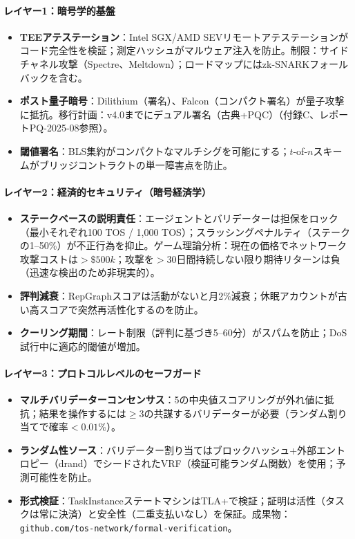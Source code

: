 \documentclass[11pt]{article}
\begin{document}
\paragraph{レイヤー1：暗号学的基盤}
\begin{itemize}[noitemsep]
  \item \textbf{TEEアテステーション}：Intel SGX/AMD SEVリモートアテステーションがコード完全性を検証；測定ハッシュがマルウェア注入を防止。制限：サイドチャネル攻撃（Spectre、Meltdown）；ロードマップにはzk-SNARKフォールバックを含む。
  \item \textbf{ポスト量子暗号}：Dilithium（署名）、Falcon（コンパクト署名）が量子攻撃に抵抗。移行計画：v4.0までにデュアル署名（古典+PQC）（付録C、レポートPQ-2025-08参照）。
  \item \textbf{閾値署名}：BLS集約がコンパクトなマルチシグを可能にする；$t$-of-$n$スキームがブリッジコントラクトの単一障害点を防止。
\end{itemize}

\paragraph{レイヤー2：経済的セキュリティ（暗号経済学）}
\begin{itemize}[noitemsep]
  \item \textbf{ステークベースの説明責任}：エージェントとバリデーターは担保をロック（最小それぞれ100 TOS / 1,000 TOS）；スラッシングペナルティ（ステークの1--50\%）が不正行為を抑止。ゲーム理論分析：現在の価格でネットワーク攻撃コストは$>\$500k$；攻撃を$>30$日間持続しない限り期待リターンは負（迅速な検出のため非現実的）。
  \item \textbf{評判減衰}：RepGraphスコアは活動がないと月2\%減衰；休眠アカウントが古い高スコアで突然再活性化するのを防止。
  \item \textbf{クーリング期間}：レート制限（評判に基づき5--60分）がスパムを防止；DoS試行中に適応的閾値が増加。
\end{itemize}

\paragraph{レイヤー3：プロトコルレベルのセーフガード}
\begin{itemize}[noitemsep]
  \item \textbf{マルチバリデーターコンセンサス}：5の中央値スコアリングが外れ値に抵抗；結果を操作するには$\geq3$の共謀するバリデーターが必要（ランダム割り当てで確率$<0.01\%$）。
  \item \textbf{ランダム性ソース}：バリデーター割り当てはブロックハッシュ+外部エントロピー（drand）でシードされたVRF（検証可能ランダム関数）を使用；予測可能性を防止。
  \item \textbf{形式検証}：TaskInstanceステートマシンはTLA+で検証；証明は活性（タスクは常に決済）と安全性（二重支払いなし）を保証。成果物：\texttt{github.com/tos-network/formal-verification}。
\end{itemize}
\end{document}
